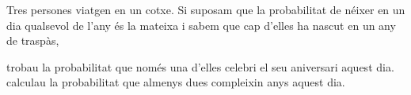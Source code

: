 \begin{mylist}
 

 \exer Tres persones viatgen en un cotxe. Si suposam que la probabilitat de néixer en un dia qualsevol de l'any és la mateixa i sabem que cap d'elles ha nascut en un any de traspàs, 
\begin{tasks}
	\task  trobau la probabilitat que només una d'elles celebri el seu aniversari aquest dia.
	\task  calculau la probabilitat que almenys dues compleixin anys aquest dia.
\end{tasks}
\answers[cols=1]{[$3\left(\dfrac{1}{365}\right)\left(\dfrac{364}{365}\right)^2 = 0,008174203184$, 
  $3 \left(\dfrac{1}{365}\right)^2 \left(\dfrac{364}{365}\right)+ \left(\dfrac{1}{365}\right)^3 = 0,000022456602$
 ]}
\end{mylist}

\pagebreak

